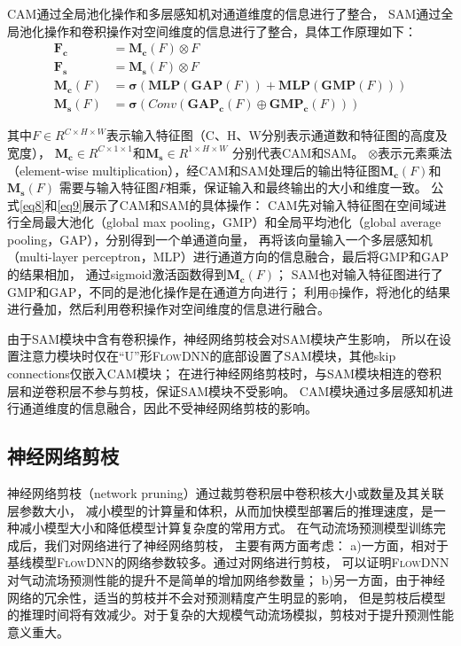CAM通过全局池化操作和多层感知机对通道维度的信息进行了整合，
SAM通过全局池化操作和卷积操作对空间维度的信息进行了整合，具体工作原理如下：
\begin{align}
\mathbf{F}_{\mathbf{c}} &=\mathbf{M}_{\mathbf{c}}(F) \otimes F \\
\mathbf{F}_{\mathbf{s}} &=\mathbf{M}_{\mathbf{s}}\left(F\right) \otimes F \\
\mathbf{M}_{\mathbf{c}}(F) &=\mathbf{\sigma}(\mathbf{MLP}(\mathbf{GAP}(F))+\mathbf{MLP}(\mathbf{GMP}(F))) \label{eq8}\\
\mathbf{M}_{\mathbf{s}}(F) &=\mathbf{\sigma}\left(Conv\left(\mathbf{GAP}_\mathbf{c}\left(F\right) \oplus \mathbf{GMP}_\mathbf{c}\left(F\right)\right)\right) \label{eq9}
\end{align}

\noindent 其中$F \in R^{C \times H \times W}$表示输入特征图（C、H、W分别表示通道数和特征图的高度及宽度），
$\mathbf{M}_{\mathbf{c}} \in R^{C \times 1 \times 1}$和$\mathbf{M}_{\mathbf{s}} \in R^{1 \times H \times W}$
分别代表CAM和SAM。
$\otimes$表示元素乘法（element-wise multiplication），经CAM和SAM处理后的输出特征图$\mathbf{M}_{\mathbf{c}}(F)$和$\mathbf{M}_{\mathbf{s}}\left(F\right)$
需要与输入特征图$F$相乘，保证输入和最终输出的大小和维度一致。
公式\ref{eq8}和\ref{eq9}展示了CAM和SAM的具体操作：
CAM先对输入特征图在空间域进行全局最大池化（global  max pooling，GMP）和全局平均池化（global average pooling，GAP），分别得到一个单通道向量，
再将该向量输入一个多层感知机（multi-layer perceptron，MLP）进行通道方向的信息融合，最后将GMP和GAP的结果相加，
通过sigmoid激活函数得到$\mathbf{M}_{\mathbf{c}}(F)$；
SAM也对输入特征图进行了GMP和GAP，不同的是池化操作是在通道方向进行；
利用$\oplus$操作，将池化的结果进行叠加，然后利用卷积操作对空间维度的信息进行融合。

由于SAM模块中含有卷积操作，神经网络剪枝会对SAM模块产生影响，
所以在设置注意力模块时仅在“U”形\textsc{FlowDNN}的底部设置了SAM模块，其他skip connections仅嵌入CAM模块；
在进行神经网络剪枝时，与SAM模块相连的卷积层和逆卷积层不参与剪枝，保证SAM模块不受影响。
CAM模块通过多层感知机进行通道维度的信息融合，因此不受神经网络剪枝的影响。


\subsection{神经网络剪枝}
神经网络剪枝（network pruning）通过裁剪卷积层中卷积核大小或数量及其关联层参数大小，
减小模型的计算量和体积，从而加快模型部署后的推理速度，是一种减小模型大小和降低模型计算复杂度的常用方式。
在气动流场预测模型训练完成后，我们对网络进行了神经网络剪枝\cite{DBLP:conf/iclr/LiuSZHD19}，
主要有两方面考虑：
a)一方面，相对于基线模型\textsc{FlowDNN}的网络参数较多。通过对网络进行剪枝，
可以证明\textsc{FlowDNN}对气动流场预测性能的提升不是简单的增加网络参数量；
b)另一方面，由于神经网络的冗余性，适当的剪枝并不会对预测精度产生明显的影响，
但是剪枝后模型的推理时间将有效减少。对于复杂的大规模气动流场模拟，剪枝对于提升预测性能意义重大。

